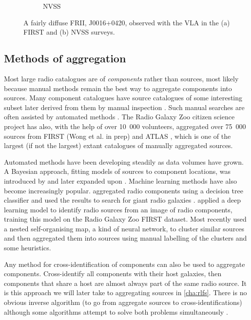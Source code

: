 \begin{figure}
\begin{subfigure}{0.45\textwidth}
                \caption{NVSS}
                \label{fig:im-contours-nvss}
            \end{subfigure}
            \caption[An example of a `resolved out' radio galaxy.]{\label{fig:resolved-out} A fairly diffuse FRII, J0016+0420, observed with the VLA in the (a) FIRST \citep{becker95first} and (b) NVSS \citep{condon98nvss} surveys. \citep[GRG1 from ][]{dabhade_discovery_2017}}
        \end{figure}

    \subsection{Methods of aggregation}
    \label{sec:methods-aggregation}

        Most large radio catalogues are of \emph{components} rather than sources, most likely because manual methods remain the best way to aggregate components into sources. Many component catalogues have source catalogues of some interesting subset later derived from them by manual inspection \citep[e.g.][]{dabhade_discovery_2017}. Such manual searches are often assisted by automated methods \citep[e.g.][]{proctor_morphological_2011}. The Radio Galaxy Zoo citizen science project has also, with the help of over 10~000 volunteers, aggregated over 75~000 sources from FIRST (Wong et al. in prep) and ATLAS \citep{banfield15}, which is one of the largest (if not the largest) extant catalogues of manually aggregated sources.

        Automated methods have been developing steadily as data volumes have grown. A Bayesian approach, fitting models of sources to component locations, was introduced by \citet{fan15} and later expanded upon \citep{fan_optimal_2020}. Machine learning methods have also become increasingly popular. \citet{proctor_selection_2016} aggregated radio components using a decision tree classifier and used the results to search for giant radio galaxies \citep[see also][]{proctor_morphological_2011,proctor06}. \citet{wu19claran} applied a deep learning model to identify radio sources from an image of radio components, training this model on the Radio Galaxy Zoo FIRST dataset. Most recently \citet{galvin_cataloguing_2020} used a nested self-organising map, a kind of neural network, to cluster similar sources and then aggregated them into sources using manual labelling of the clusters and some heuristics.

        Any method for cross-identification of components can also be used to aggregate components. Cross-identify all components with their host galaxies, then components that share a host are almost always part of the same radio source. It is this approach we will later take to aggregating sources in \autoref{cha:rlfs}. There is no obvious inverse algorithm (to go from aggregate sources to cross-identifications) although some algorithms attempt to solve both problems simultaneously \citep{fan_optimal_2020,fan15}.


